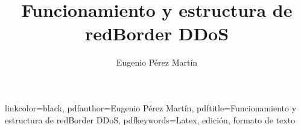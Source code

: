 \documentclass[11pt,twoside,notitlepage,twocolumn]{article}
\begin{document}



\newcommand{\thetitle}{Funcionamiento y estructura de redBorder DDoS}
\newcommand{\theautor}{Eugenio Pérez Martín}
\title{\thetitle} %
\author{\theautor}

\hypersetup
	{
 	linkcolor=black, %
	pdfauthor={\theautor},
	pdftitle={\thetitle}, 
	pdfkeywords={Latex, edición, formato de texto}	
	 }

\maketitle

 


%

%

%

%

%

%

% 
%
%
%

%

\end{document}
